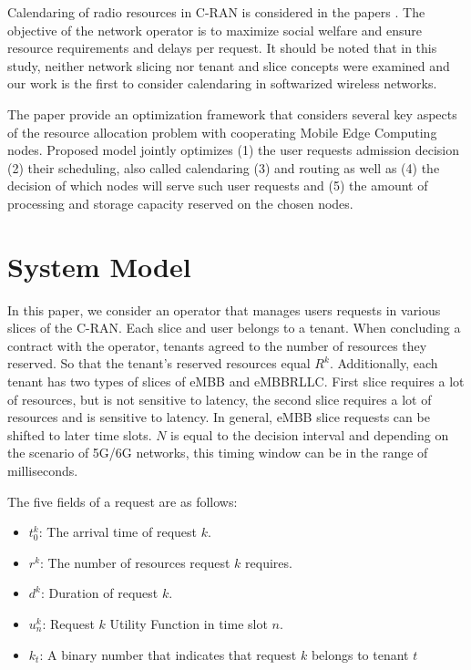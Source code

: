 \documentclass[conference]{IEEEtran}
\begin{document}
Calendaring of radio resources in C-RAN is considered in the papers \cite{elias2018radio, morcos2019efficient}. The objective of the network operator is to maximize social welfare and ensure resource requirements and delays per request. It should be noted that in this study, neither network slicing nor tenant and slice concepts were examined and our work is the first to consider calendaring in softwarized wireless networks.

The paper \cite{xiang2021resource} provide an optimization framework that considers several key aspects of the resource allocation problem with cooperating Mobile Edge Computing nodes. Proposed model jointly optimizes (1) the user requests admission decision (2) their scheduling, also called calendaring (3) and routing as well as (4) the decision of which nodes will serve such user requests and (5) the amount of processing and storage capacity reserved on the chosen nodes.

\section{System Model}
In this paper, we consider an operator that manages users requests in various slices of the C-RAN. Each slice and user belongs to a tenant. When concluding a contract with the operator, tenants agreed to the number of resources they reserved. So that the tenant's reserved resources equal $R^k$. Additionally, each tenant has two types of slices of eMBB and eMBBRLLC. First slice requires a lot of resources, but is not sensitive to latency, the second slice requires a lot of resources and is sensitive to latency. In general, eMBB slice requests can be shifted to later time slots. $N$ is equal to the decision interval and depending on the scenario of 5G/6G networks, this timing window can be in the range of milliseconds.

The five fields of a request are as follows:
\begin{itemize}
  \item $t_{0}^{k}$: The arrival time of request $k$.
  \item $r^k$: The number of resources request $k$ requires.
  \item $d^k$: Duration of request $k$.
  \item $u_{n}^{k}$: Request $k$ Utility Function in time slot $n$.
  \item $k_t$: A binary number that indicates that request $k$ belongs to tenant $t$
\end{itemize}
\end{document}
